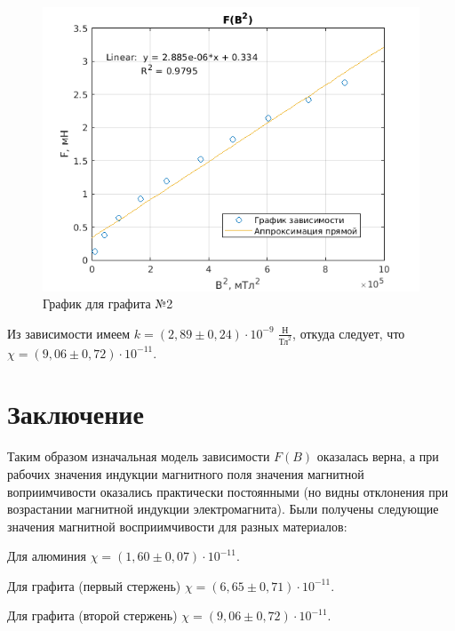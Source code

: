 \begin{figure}[h]
    \centering
    \includegraphics[width = 12 cm]{images/gr2.png}
    \caption{График для графита №2}
    \label{gr1}
\end{figure}

Из зависимости имеем $k = (2,89 \pm 0,24) \cdot 10^{-9} \; \frac{\text{Н}}{\text{Тл}^2}$, откуда следует, что $\chi = (9,06 \pm 0,72) \cdot 10^{-11}$.

\section{Заключение}

Таким образом изначальная модель зависимости $F(B)$ оказалась верна, а при рабочих значения индукции магнитного поля значения магнитной воприимчивости оказались практически постоянными (но видны отклонения при возрастании магнитной индукции электромагнита). Были получены следующие значения магнитной восприимчивости для разных материалов:

Для алюминия $\chi = (1,60 \pm 0,07) \cdot 10^{-11}$.

Для графита (первый стержень) $\chi = (6,65 \pm 0,71) \cdot 10^{-11}$. 

Для графита (второй стержень) $\chi = (9,06 \pm 0,72) \cdot 10^{-11}$.

























